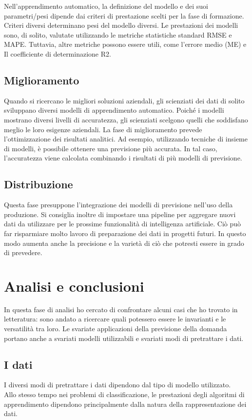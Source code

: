 \documentclass[12pt,a4paper]{report}
\begin{document}
Nell'apprendimento automatico, la definizione del modello e dei suoi parametri/pesi dipende dai criteri di prestazione scelti per la fase di formazione. Criteri diversi determinano pesi del modello diversi.
Le prestazioni dei modelli sono, di solito, valutate utilizzando le metriche statistiche standard RMSE e MAPE. Tuttavia, altre metriche possono essere utili, come l'errore medio (ME) e Il coefficiente di determinazione R2.


\subsection{Miglioramento}
Quando si ricercano le migliori soluzioni aziendali, gli scienziati dei dati di solito sviluppano diversi modelli di apprendimento automatico. Poiché i modelli mostrano diversi livelli di accuratezza, gli scienziati scelgono quelli che soddisfano meglio le loro esigenze aziendali. La fase di miglioramento prevede l'ottimizzazione dei risultati analitici. Ad esempio, utilizzando tecniche di insieme di modelli, è possibile ottenere una previsione più accurata. In tal caso, l'accuratezza viene calcolata combinando i risultati di più modelli di previsione.


\subsection{Distribuzione}
Questa fase presuppone l'integrazione dei modelli di previsione nell'uso della produzione. Si consiglia inoltre di impostare una pipeline per aggregare nuovi dati da utilizzare per le prossime funzionalità di intelligenza artificiale. Ciò può far risparmiare molto lavoro di preparazione dei dati in progetti futuri. In questo modo aumenta anche la precisione e la varietà di ciò che potresti essere in grado di prevedere.


\section{Analisi e conclusioni}
In questa fase di analisi ho cercato di confrontare alcuni casi che ho trovato in letteratura: sono andato a ricercare quali potessero essere le invarianti e le versatilità tra loro.
Le svariate applicazioni della previsione della domanda portano anche a svariati modelli utilizzabili e svariati modi di pretrattare i dati.\\

\subsection{I dati}
I diversi modi di pretrattare i dati dipendono dal tipo di modello utilizzato.\\
Allo stesso tempo nei problemi di classificazione, le prestazioni degli algoritmi di apprendimento dipendono principalmente dalla natura della rappresentazione dei dati.\\
\end{document}
